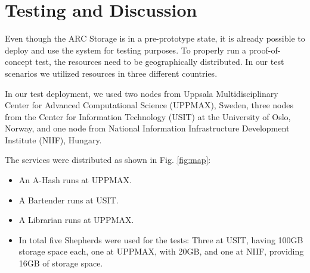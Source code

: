 \documentclass[final]{ieee}
\begin{document}
\section{Testing and Discussion}
\label{Testing and Discussion}

Even though the ARC Storage is in a pre-prototype state, it is already
possible to deploy and use the system for testing purposes. To
properly run a proof-of-concept test, the resources need to be
geographically distributed. In our test scenarios we utilized
resources in three different countries.

In our test deployment, we used two nodes from Uppsala
Multidisciplinary Center for Advanced Computational Science (UPPMAX), Sweden, 
three nodes from the Center for Information Technology (USIT) at the
University of Oslo, Norway, 
and one node from National Information Infrastructure Development Institute (NIIF),
Hungary. %

The services were distributed as shown in Fig. \ref{fig:map}:
\begin{itemize}
\item An A-Hash runs at UPPMAX.
\item A Bartender runs at USIT.
\item A Librarian runs at UPPMAX.
\item In total five Shepherds were used for the tests: Three at USIT, having
  100GB storage space each, one at UPPMAX, with 20GB, and one at NIIF, providing 16GB of storage space.
 \end{itemize}
\end{document}

